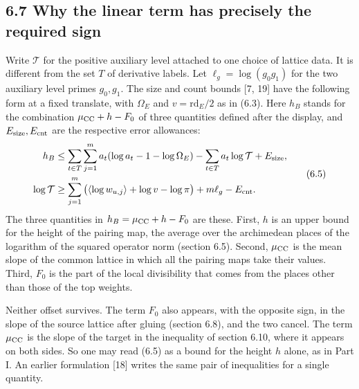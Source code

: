 \documentclass[11pt,letterpaper]{article}
\begin{document}
{\newpage
\subsection*{6.7 Why the linear term has precisely the required sign}

Write $\mathcal T$ for the positive auxiliary level attached to one choice of lattice data. It is different from the set $T$ of derivative labels. Let $\ell_g=\log(g_0g_1)$ for the two auxiliary level primes $g_0,g_1$. The size and count bounds [7, 19] have the following form at a fixed translate, with $\Omega_E$ and $v=\mathrm{rd}_E/2$ as in (6.3). Here $h_B$ stands for the combination $\mu_{\rm CC}+h-F_0$ of three quantities defined after the display, and $E_{\rm size},E_{\rm cnt}$ are the respective error allowances:
\begin{equation}\label{D:97}
 \begin{aligned}
 h_B &\le \sum_{t\in T}\sum_{j=1}^m a_t(\log a_t-1-\log\Omega_E)
               -\sum_{t\in T}a_t\log\mathcal T+E_{\rm size},\\
 \log\mathcal T &\ge
  \sum_{j=1}^m\big(\langle\log w_{u,j}\rangle+\log v-\log\pi\big)
             +m\ell_g-E_{\rm cnt}.
 \end{aligned}                                                   \tag{6.5}
\end{equation}
The three quantities in $h_B=\mu_{\rm CC}+h-F_0$ are these. First, $h$ is an upper bound for the height of the pairing map, the average over the archimedean places of the logarithm of the squared operator norm (section 6.5). Second, $\mu_{\rm CC}$ is the mean slope of the common lattice in which all the pairing maps take their values. Third, $F_0$ is the part of the local divisibility that comes from the places other than those of the top weights.

Neither offset survives. The term $F_0$ also appears, with the opposite sign, in the slope of the source lattice after gluing (section 6.8), and the two cancel. The term $\mu_{\rm CC}$ is the slope of the target in the inequality of section 6.10, where it appears on both sides. So one may read (6.5) as a bound for the height $h$ alone, as in Part I. An earlier formulation [18] writes the same pair of inequalities for a single quantity.

}
\end{document}
